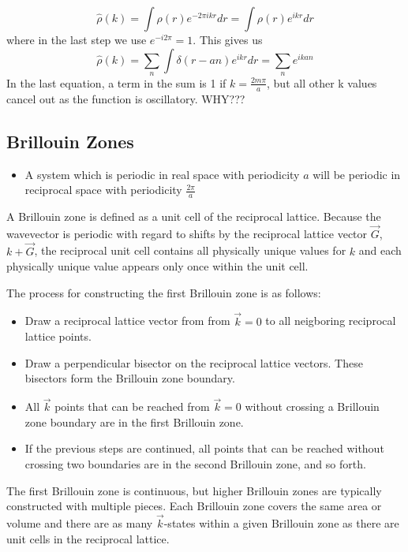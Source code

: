 \documentclass{article}
\begin{document}
\begin{equation}
\hat{\rho}(k) = \int \rho(r)e^{-2\pi ikr}dr = \int \rho(r)e^{ikr}dr
\end{equation}
where in the last step we use $e^{-i2\pi} = 1$. This gives us
\begin{equation}
\hat{\rho}(k) = \sum_{n}\int \delta(r - an)e^{ikr}dr = \sum_{n}e^{ikan}
\end{equation}
In the last equation, a term in the sum is 1 if $k = \frac{2m\pi}{a}$, but all other k
values cancel out as the function is oscillatory. WHY???

\subsection{Brillouin Zones}
\begin{itemize}
\item A system which is periodic in real space with periodicity $a$ will be periodic in reciprocal
space with periodicity $\frac{2\pi}{a}$
\end{itemize}
A Brillouin zone is defined as a unit cell of the reciprocal lattice. Because the wavevector is
periodic with regard to shifts by the reciprocal lattice vector $\vec{G}$, $k + \vec{G}$, the reciprocal unit cell
contains all physically unique values for $k$ and each physically unique value appears only once within the unit cell. \par
The process for constructing the first Brillouin zone is as follows:
\begin{itemize}
\item Draw a reciprocal lattice vector from from $\vec{k} = 0$ to all neigboring reciprocal lattice points.
\item Draw a perpendicular bisector on the reciprocal lattice vectors. These bisectors form the Brillouin zone boundary.
\item All $\vec{k}$ points that can be reached from $\vec{k} = 0$ without crossing a Brillouin zone boundary are in the
 first Brillouin zone.
 \item If the previous steps are continued, all points that can be reached without crossing two boundaries are in the
  second Brillouin zone, and so forth.
\end{itemize}
The first Brillouin zone is continuous, but higher Brillouin zones are typically constructed with multiple pieces. Each Brillouin zone
covers the same area or volume and there are as many $\vec{k}$-states within a given Brillouin zone as there are unit cells in
the reciprocal lattice.
\end{document}
